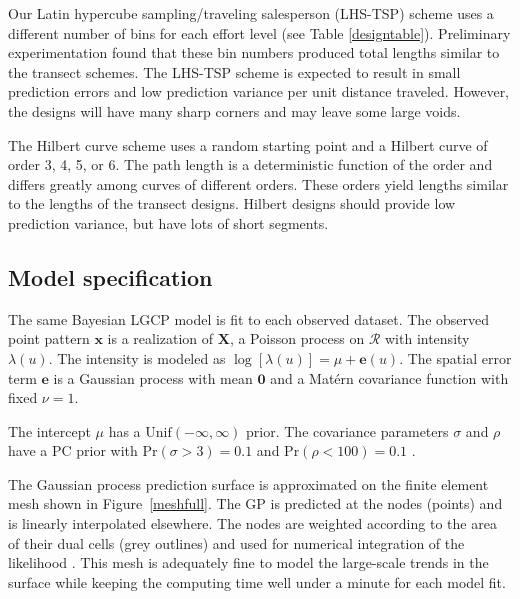 \documentclass[review]{elsarticle}
\begin{document}
Our Latin hypercube sampling/traveling salesperson (LHS-TSP) scheme uses a
different number of bins for each effort level (see Table \ref{designtable}).
Preliminary experimentation found that these bin numbers produced total lengths
similar to the transect schemes. The LHS-TSP scheme is expected to result
in small prediction errors and low prediction variance per unit distance
traveled. However, the designs will have many sharp corners and may leave some
large voids.

The Hilbert curve scheme uses a random starting point and a Hilbert curve of
order 3, 4, 5, or 6. The path length is a deterministic function of the order
and differs greatly among curves of different orders. These orders yield
lengths similar to the lengths of the transect designs. Hilbert designs should
provide low prediction variance, but have lots of short segments.


\subsection{Model specification}
\label{simmodel}

The same Bayesian LGCP model is fit to each observed dataset. The observed
point pattern \(\mathbf{x}\) is a realization of \(\mathbf{X}\), a Poisson
process on \(\mathcal{R}\) with intensity \(\lambda(u)\). The intensity is
modeled as \(\log[\lambda(u)] = \mu + \mathbf{e}(u)\). The spatial error term
\(\mathbf{e}\) is a Gaussian process with mean \(\mathbf{0}\) and a
Mat\'{e}rn covariance function with fixed \(\nu = 1\).

The intercept \(\mu\) has a \(\mathrm{Unif}(-\infty, \infty)\) prior.
The covariance parameters \(\sigma\) and \(\rho\) have a PC prior with
\(\mathrm{Pr}(\sigma > 3) = 0.1\) and \(\mathrm{Pr}(\rho < 100) = 0.1\)
\citep{fuglstadetal,simpsonpc}.

The Gaussian process prediction surface is approximated on the finite element
mesh shown in Figure~\ref{meshfull}. The GP is predicted at the nodes (points)
and is linearly interpolated elsewhere. The nodes are weighted according to
the area of their dual cells (grey outlines) and used for numerical integration
of the likelihood \citep{lindgrenetal}. This mesh is adequately fine to model
the large-scale trends in the surface while keeping the computing time well
under a minute for each model fit.
\end{document}
